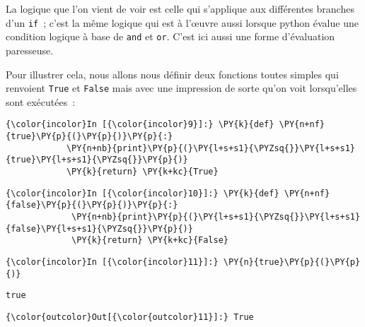    La logique que l'on vient de voir est celle qui s'applique aux
différentes branches d'un \texttt{if}~; c'est la même logique qui est à
l'œuvre aussi lorsque python évalue une condition logique à base de
\texttt{and} et \texttt{or}. C'est ici aussi une forme d'évaluation
paresseuse.

    Pour illustrer cela, nous allons nous définir deux fonctions toutes
simples qui renvoient \texttt{True} et \texttt{False} mais avec une
impression de sorte qu'on voit lorsqu'elles sont exécutées~:

    \begin{Verbatim}[commandchars=\\\{\},frame=single,framerule=0.3mm,rulecolor=\color{cellframecolor}]
{\color{incolor}In [{\color{incolor}9}]:} \PY{k}{def} \PY{n+nf}{true}\PY{p}{(}\PY{p}{)}\PY{p}{:}
            \PY{n+nb}{print}\PY{p}{(}\PY{l+s+s1}{\PYZsq{}}\PY{l+s+s1}{true}\PY{l+s+s1}{\PYZsq{}}\PY{p}{)}
            \PY{k}{return} \PY{k+kc}{True}
\end{Verbatim}


    \begin{Verbatim}[commandchars=\\\{\},frame=single,framerule=0.3mm,rulecolor=\color{cellframecolor}]
{\color{incolor}In [{\color{incolor}10}]:} \PY{k}{def} \PY{n+nf}{false}\PY{p}{(}\PY{p}{)}\PY{p}{:}
             \PY{n+nb}{print}\PY{p}{(}\PY{l+s+s1}{\PYZsq{}}\PY{l+s+s1}{false}\PY{l+s+s1}{\PYZsq{}}\PY{p}{)}
             \PY{k}{return} \PY{k+kc}{False}
\end{Verbatim}


    \begin{Verbatim}[commandchars=\\\{\},frame=single,framerule=0.3mm,rulecolor=\color{cellframecolor}]
{\color{incolor}In [{\color{incolor}11}]:} \PY{n}{true}\PY{p}{(}\PY{p}{)}
\end{Verbatim}


    \begin{Verbatim}[commandchars=\\\{\},frame=single,framerule=0.3mm,rulecolor=\color{cellframecolor}]
true
\end{Verbatim}

\begin{Verbatim}[commandchars=\\\{\},frame=single,framerule=0.3mm,rulecolor=\color{cellframecolor}]
{\color{outcolor}Out[{\color{outcolor}11}]:} True
\end{Verbatim}
            
